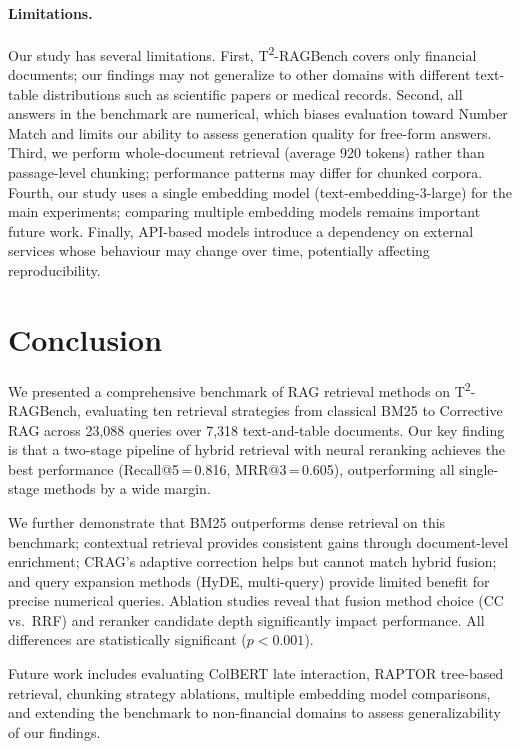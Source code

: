 \documentclass[11pt]{article}
\begin{document}
\paragraph{Limitations.}
Our study has several limitations. First, T\textsuperscript{2}-RAGBench covers only financial documents; our findings may not generalize to other domains with different text-table distributions such as scientific papers or medical records. Second, all answers in the benchmark are numerical, which biases evaluation toward Number Match and limits our ability to assess generation quality for free-form answers. Third, we perform whole-document retrieval (average 920 tokens) rather than passage-level chunking; performance patterns may differ for chunked corpora. Fourth, our study uses a single embedding model (text-embedding-3-large) for the main experiments; comparing multiple embedding models remains important future work. Finally, API-based models introduce a dependency on external services whose behaviour may change over time, potentially affecting reproducibility.

\section{Conclusion}
\label{sec:conclusion}

We presented a comprehensive benchmark of RAG retrieval methods on T\textsuperscript{2}-RAGBench, evaluating ten retrieval strategies from classical BM25 to Corrective RAG across 23,088 queries over 7,318 text-and-table documents. Our key finding is that a two-stage pipeline of hybrid retrieval with neural reranking achieves the best performance (Recall@5\,=\,0.816, MRR@3\,=\,0.605), outperforming all single-stage methods by a wide margin.

We further demonstrate that BM25 outperforms dense retrieval on this benchmark; contextual retrieval provides consistent gains through document-level enrichment; CRAG's adaptive correction helps but cannot match hybrid fusion; and query expansion methods (HyDE, multi-query) provide limited benefit for precise numerical queries. Ablation studies reveal that fusion method choice (CC vs.\ RRF) and reranker candidate depth significantly impact performance. All differences are statistically significant ($p < 0.001$).

Future work includes evaluating ColBERT late interaction, RAPTOR tree-based retrieval, chunking strategy ablations, multiple embedding model comparisons, and extending the benchmark to non-financial domains to assess generalizability of our findings.
\end{document}
